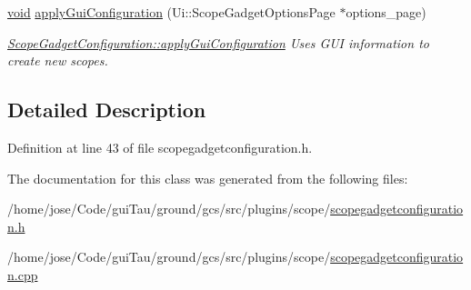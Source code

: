 \begin{DoxyCompactItemize}
\hyperlink{group___u_a_v_objects_plugin_ga444cf2ff3f0ecbe028adce838d373f5c}{void} \hyperlink{group___scope_plugin_gaa68457b9b187faa4190e2f5d1343cbbb}{apply\-Gui\-Configuration} (Ui\-::\-Scope\-Gadget\-Options\-Page $\ast$options\-\_\-page)
\begin{DoxyCompactList}\small\item\em \hyperlink{group___scope_plugin_gaa68457b9b187faa4190e2f5d1343cbbb}{Scope\-Gadget\-Configuration\-::apply\-Gui\-Configuration} Uses G\-U\-I information to create new scopes. \end{DoxyCompactList}\end{DoxyCompactItemize}


\subsection{Detailed Description}


Definition at line 43 of file scopegadgetconfiguration.\-h.



The documentation for this class was generated from the following files\-:\begin{DoxyCompactItemize}
\item 
/home/jose/\-Code/gui\-Tau/ground/gcs/src/plugins/scope/\hyperlink{scopegadgetconfiguration_8h}{scopegadgetconfiguration.\-h}\item 
/home/jose/\-Code/gui\-Tau/ground/gcs/src/plugins/scope/\hyperlink{scopegadgetconfiguration_8cpp}{scopegadgetconfiguration.\-cpp}\end{DoxyCompactItemize}
